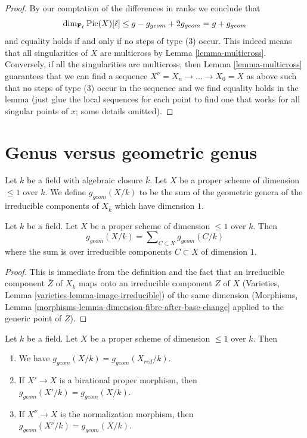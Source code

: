 \begin{proof}
By our comptation of the differences in ranks we conclude that
$$
\dim_{\mathbf{F}_\ell} \mathop{\mathrm{Pic}}\nolimits(X)[\ell] \leq
g - g_{geom} + 2g_{geom} = g + g_{geom}
$$
and equality holds if and only if no steps of type (3) occur.
This indeed means that all singularities of $X$ are multicross
by Lemma \ref{lemma-multicross}. Conversely, if all the singularities
are multicross, then Lemma \ref{lemma-multicross} guarantees that
we can find a sequence $X^\nu = X_n \to \ldots \to X_0 = X$
as above such that no steps of type (3) occur in the sequence
and we find equality holds in the lemma (just glue the local sequences
for each point to find one that works for all singular points of $x$;
some details omitted).
\end{proof}





\section{Genus versus geometric genus}
\label{section-genus-geometric-genus}

\noindent
Let $k$ be a field with algebraic closure $\overline{k}$.
Let $X$ be a proper scheme of dimension $\leq 1$ over $k$.
We define $g_{geom}(X/k)$ to be the sum of the geometric genera
of the irreducible components of $X_{\overline{k}}$ which have dimension $1$.

\begin{lemma}
\label{lemma-bound-geometric-genus}
Let $k$ be a field. Let $X$ be a proper scheme of dimension $\leq 1$ over $k$.
Then
$$
g_{geom}(X/k) = \sum\nolimits_{C \subset X} g_{geom}(C/k)
$$
where the sum is over irreducible components $C \subset X$ of dimension $1$.
\end{lemma}

\begin{proof}
This is immediate from the definition and the fact that an irreducible
component $\overline{Z}$ of $X_{\overline{k}}$ maps onto an
irreducible component $Z$ of $X$
(Varieties, Lemma \ref{varieties-lemma-image-irreducible})
of the same dimension
(Morphisms, Lemma \ref{morphisms-lemma-dimension-fibre-after-base-change}
applied to the generic point of $\overline{Z}$).
\end{proof}

\begin{lemma}
\label{lemma-geometric-genus-normalization}
Let $k$ be a field. Let $X$ be a proper scheme of dimension $\leq 1$ over $k$.
Then
\begin{enumerate}
\item We have $g_{geom}(X/k) = g_{geom}(X_{red}/k)$.
\item If $X' \to X$ is a birational proper morphism, then
$g_{geom}(X'/k) = g_{geom}(X/k)$.
\item If $X^\nu \to X$ is the normalization morphism, then
$g_{geom}(X^\nu/k) = g_{geom}(X/k)$.
\end{enumerate}
\end{lemma}

